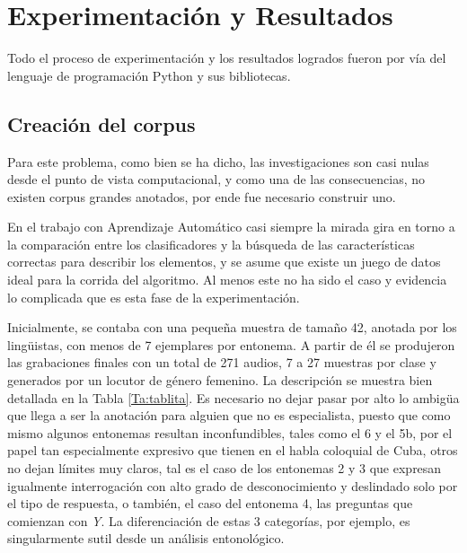 \chapter{Experimentaci\'on y Resultados}\label{chapter:resultados}
Todo el proceso de experimentaci\'on y los resultados logrados fueron por v\'ia del lenguaje de programaci\'on Python y sus bibliotecas. 

\section{Creaci\'on del corpus}

Para este problema, como bien se ha dicho, las investigaciones son casi nulas desde el punto de vista computacional, y como una de las consecuencias, no existen corpus grandes anotados, por ende fue necesario construir uno. 

En el trabajo con Aprendizaje Autom\'atico casi siempre la mirada gira en torno a la comparaci\'on entre los clasificadores y la b\'usqueda de las caracter\'isticas correctas para describir los elementos, y se asume que existe un juego de datos ideal para la corrida del algoritmo. Al menos este no ha sido el caso y evidencia lo complicada que es esta fase de la experimentaci\'on.

Inicialmente, se contaba con una pequeña muestra de tamaño 42, anotada por los ling\"uistas, con menos de 7 ejemplares por entonema. A partir de \'el se produjeron las grabaciones finales con un total de 271 audios, 7 a 27 muestras por clase y generados por un locutor de g\'enero femenino. La descripci\'on se muestra bien detallada en la Tabla \ref{Ta:tablita}. Es necesario no dejar pasar por alto lo ambig\"ua que llega a ser la anotaci\'on para alguien que no es especialista, puesto que como mismo algunos entonemas resultan inconfundibles, tales como el 6 y el 5b, por el papel tan especialmente expresivo que tienen en el habla coloquial de Cuba, otros no dejan l\'imites muy claros, tal es el caso de los entonemas 2 y 3 que expresan igualmente interrogaci\'on con alto grado de desconocimiento y deslindado solo por el tipo de respuesta, o tambi\'en, el caso del entonema 4, las preguntas que comienzan con \emph{Y}. La diferenciaci\'on de estas 3 categor\'ias, por ejemplo, es singularmente sutil desde un an\'alisis entonol\'ogico.

